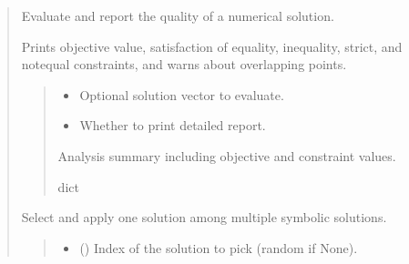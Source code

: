 \documentclass[letterpaper,10pt,english]{sphinxmanual}
\begin{document}
\begin{quote}
\begin{fulllineitems}
\begin{fulllineitems}
\label{\detokenize{pygeox:pygeox.solver.SolverNamespace.numerical_analysis}}
\pysigstartsignatures
\pysiglinewithargsret
{}
{\sphinxparamcomma {}}
{}
\pysigstopsignatures
\sphinxAtStartPar
Evaluate and report the quality of a numerical solution.

\sphinxAtStartPar
Prints objective value, satisfaction of equality, inequality, strict,
and not\sphinxhyphen{}equal constraints, and warns about overlapping points.
\begin{quote}\begin{description}
\begin{itemize}
\item {} 
\sphinxAtStartPar
{} \textendash{} Optional solution vector to evaluate.

\item {} 
\sphinxAtStartPar
{} \textendash{} Whether to print detailed report.

\end{itemize}

\sphinxAtStartPar
Analysis summary including objective and constraint values.

\sphinxAtStartPar
dict

\end{description}\end{quote}

\end{fulllineitems}


\begin{fulllineitems}
\label{\detokenize{pygeox:pygeox.solver.SolverNamespace.pick_solution}}
\pysigstartsignatures
\pysiglinewithargsret
{}
{\sphinxparamcomma {}}
{}
\pysigstopsignatures
\sphinxAtStartPar
Select and apply one solution among multiple symbolic solutions.
\begin{quote}\begin{description}
\begin{itemize}
\item {} 
\sphinxAtStartPar
{} () \textendash{} Index of the solution to pick (random if None).


\end{itemize}
\end{description}
\end{quote}
\end{fulllineitems}
\end{fulllineitems}
\end{quote}
\end{document}
